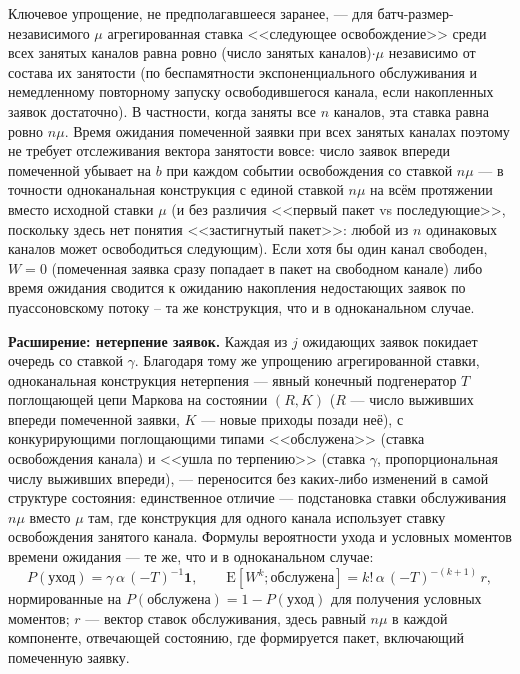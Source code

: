 \documentclass[12pt,a4paper]{article}
\begin{document}
Ключевое упрощение, не предполагавшееся заранее, --- для батч-размер-независимого $\mu$ агрегированная ставка <<следующее освобождение>> среди всех занятых каналов равна ровно (число занятых каналов)$\cdot\mu$ независимо от состава их занятости (по беспамятности экспоненциального обслуживания и немедленному повторному запуску освободившегося канала, если накопленных заявок достаточно). В частности, когда заняты все $n$ каналов, эта ставка равна ровно $n\mu$. Время ожидания помеченной заявки при всех занятых каналах поэтому не требует отслеживания вектора занятости вовсе: число заявок впереди помеченной убывает на $b$ при каждом событии освобождения со ставкой $n\mu$ --- в точности одноканальная конструкция \cite{khabarovsingle2026} с единой ставкой $n\mu$ на всём протяжении вместо исходной ставки $\mu$ (и без различия <<первый пакет vs последующие>>, поскольку здесь нет понятия <<застигнутый пакет>>: любой из $n$ одинаковых каналов может освободиться следующим). Если хотя бы один канал свободен, $W=0$ (помеченная заявка сразу попадает в пакет на свободном канале) либо время ожидания сводится к ожиданию накопления недостающих заявок по пуассоновскому потоку -- та же конструкция, что и в одноканальном случае.

\noindent\textbf{Расширение: нетерпение заявок.} Каждая из $j$ ожидающих заявок покидает очередь со ставкой $\gamma$. Благодаря тому же упрощению агрегированной ставки, одноканальная конструкция нетерпения \cite{khabarovsingle2026} --- явный конечный подгенератор $T$ поглощающей цепи Маркова на состоянии $(R,K)$ ($R$ --- число выживших впереди помеченной заявки, $K$ --- новые приходы позади неё), с конкурирующими поглощающими типами <<обслужена>> (ставка освобождения канала) и <<ушла по терпению>> (ставка $\gamma$, пропорциональная числу выживших впереди), --- переносится без каких-либо изменений в самой структуре состояния: единственное отличие --- подстановка ставки обслуживания $n\mu$ вместо $\mu$ там, где конструкция для одного канала использует ставку освобождения занятого канала. Формулы вероятности ухода и условных моментов времени ожидания --- те же, что и в одноканальном случае:
\begin{equation}
P(\text{уход}) = \gamma\,\alpha\,(-T)^{-1}\mathbf{1}, \qquad
\mathrm{E}[W^k;\text{обслужена}] = k!\,\alpha\,(-T)^{-(k+1)}\,r,
\label{eq:abandonment}
\end{equation}
нормированные на $P(\text{обслужена})=1-P(\text{уход})$ для получения условных моментов; $r$ --- вектор ставок обслуживания, здесь равный $n\mu$ в каждой компоненте, отвечающей состоянию, где формируется пакет, включающий помеченную заявку.
\end{document}
